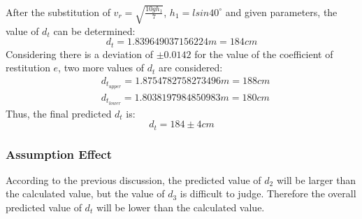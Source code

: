 \documentclass{article}
\begin{document}
            After the substitution of  $v_r = \sqrt{\frac{10gh_1}{7}}$, $h_1 = lsin40^\circ$ and given parameters, the value of $d_t$ can be determined:
            $$d_t = 1.839649037156224m = 184cm$$  
            Considering there is a deviation of $\pm 0.0142$ for the value of the coefficient of restitution $e$, two more values of $d_t$ are considered:
            \begin{align}
                &d_{t_{upper}} = 1.8754782758273496m = 188cm \nonumber\\
                &d_{t_{lower}} = 1.8038197984850983m = 180cm \nonumber
            \end{align}
            Thus, the final predicted $d_t$ is:
            \begin{equation}
                d_t = 184 \pm 4cm \label{ans:1}
            \end{equation}
    \subsubsection{Assumption Effect}
    According to the previous discussion, the predicted value of $d_2$ will be larger than the calculated value, but the value of $d_3$ is difficult to judge. Therefore the overall predicted value of $d_t$ will be lower than the calculated value.
\end{document}
